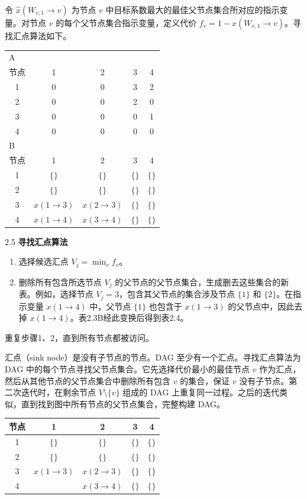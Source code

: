 令 $\widehat x(W_{v,1}\to v)$ 为节点 $v$ 中目标系数最大的最佳父节点集合所对应的指示变量。对节点 $v$ 的每个父节点集合指示变量，定义代价 $f_v=1-\widehat x(W_{v,1}\to v)$。寻找汇点算法如下。
\begin{table}[htbp]
\centering
{}
\begin{tabular}{ccccc}
\toprule
\multicolumn{5}{l}{A}\\
节点&1&2&3&4\\\midrule
1&0&0&3&2\\2&0&0&2&0\\3&0&0&0&1\\4&0&0&0&0\\
\midrule
\multicolumn{5}{l}{B}\\
节点&1&2&3&4\\\midrule
1&$\{\}$&$\{\}$&$\{\}$&$\{\}$\\
2&$\{\}$&$\{\}$&$\{\}$&$\{\}$\\
3&$x(1\to3)$&$x(2\to3)$&$\{\}$&$\{\}$\\
4&$x(1\to4)$&$x(3\to4)$&$\{\}$&$\{\}$\\
\bottomrule
\end{tabular}
\end{table}
\begin{bookalgorithm}{2.5}
\textbf{寻找汇点算法}
\begin{enumerate}
\item 选择候选汇点 $V_j=\min_v f_v$。
\item 删除所有包含所选节点 $V_j$ 的父节点的父节点集合，生成删去这些集合的新表。例如，选择节点 $V_j=3$，包含其父节点的集合涉及节点 $\{1\}$ 和 $\{2\}$。在指示变量 $x(1\to4)$ 中，父节点 $\{1\}$ 也包含于 $x(1\to3)$ 的父节点中，因此去掉 $x(1\to4)$。表2.3B经此变换后得到表2.4。
\end{enumerate}
重复步骤1、2，直到所有节点都被访问。

汇点（sink node）是没有子节点的节点。DAG 至少有一个汇点。寻找汇点算法为 DAG 中的每个节点寻找父节点集合。它先选择代价最小的最佳节点 $v$ 作为汇点，然后从其他节点的父节点集合中删除所有包含 $v$ 的集合，保证 $v$ 没有子节点。第二次迭代时，在剩余节点 $V\setminus\{v\}$ 组成的 DAG 上重复同一过程。之后的迭代类似，直到找到图中所有节点的父节点集合，完整构建 DAG。
\end{bookalgorithm}
\begin{table}[htbp]
\centering
{}
\begin{tabular}{ccccc}
\toprule
节点&1&2&3&4\\\midrule
1&$\{\}$&$\{\}$&$\{\}$&$\{\}$\\
2&$\{\}$&$\{\}$&$\{\}$&$\{\}$\\
3&$x(1\to3)$&$x(2\to3)$&$\{\}$&$\{\}$\\
4&&$x(3\to4)$&$\{\}$&$\{\}$\\
\bottomrule
\end{tabular}
\end{table}
\FloatBarrier
